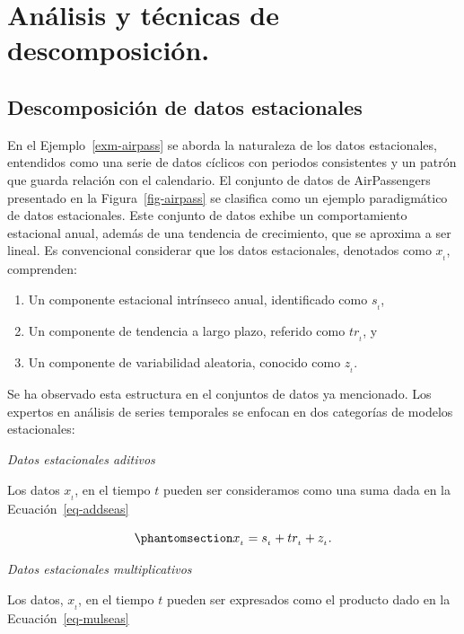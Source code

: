 \documentclass[
  us-letterpaper,
]{scrreprt}
\theoremstyle{definition}
\theoremstyle{plain}
\theoremstyle{plain}
\theoremstyle{definition}
\theoremstyle{remark}
\begin{document}
\section{Análisis y técnicas de
descomposición.}\label{anuxe1lisis-y-tuxe9cnicas-de-descomposiciuxf3n.}

\subsection{Descomposición de datos
estacionales}\label{descomposiciuxf3n-de-datos-estacionales}

En el Ejemplo~\ref{exm-airpass} se aborda la naturaleza de los datos
estacionales, entendidos como una serie de datos cíclicos con periodos
consistentes y un patrón que guarda relación con el calendario. El
conjunto de datos de AirPassengers presentado en la
Figura~\ref{fig-airpass} se clasifica como un ejemplo paradigmático de
datos estacionales. Este conjunto de datos exhibe un comportamiento
estacional anual, además de una tendencia de crecimiento, que se
aproxima a ser lineal. Es convencional considerar que los datos
estacionales, denotados como \(x_{_t}\), comprenden:

\begin{enumerate}
\def\labelenumi{\alph{enumi}.}
\item
  Un componente estacional intrínseco anual, identificado como
  \(s_{_t}\),
\item
  Un componente de tendencia a largo plazo, referido como \(tr_{_t}\), y
\item
  Un componente de variabilidad aleatoria, conocido como \(z_{_t}\).
\end{enumerate}

Se ha observado esta estructura en el conjuntos de datos ya mencionado.
Los expertos en análisis de series temporales se enfocan en dos
categorías de modelos estacionales:

\emph{Datos estacionales aditivos}

Los datos \(x_{_t}\), en el tiempo \(t\) pueden ser consideramos como
una suma dada en la Ecuación~\ref{eq-addseas}

\begin{equation}\phantomsection\label{eq-addseas}{
x_{_t}=s_{_t}+tr_{_t}+z_{_t}.
}\end{equation}

\emph{Datos estacionales multiplicativos}

Los datos, \(x_{_t}\), en el tiempo \(t\) pueden ser expresados como el
producto dado en la Ecuación~\ref{eq-mulseas}
\end{document}
